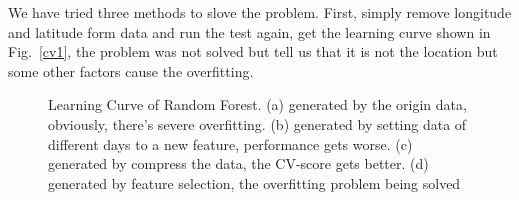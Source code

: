 \documentclass[conference, a4paper]{IEEEtran}
\begin{document}
  We have tried three methods to slove the problem. First, simply remove longitude and latitude form data and run the test again, get the learning curve shown in Fig.~\ref{cv1}, the problem was not solved but tell us that it is not the location but some other factors cause the overfitting. 

  \begin{figure}[!htb]
    \centering
  \hfill
    \caption{Learning Curve of Random Forest. (a) generated by the origin data, obviously, there's severe overfitting. (b) generated by setting data of different days to a new feature, performance gets worse. (c) generated by compress the data, the CV-score gets better. (d) generated by feature selection, the overfitting problem being solved}
  \end{figure}
\end{document}
